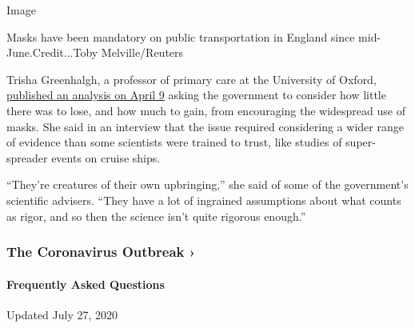 Image

Masks have been mandatory on public transportation in England since
mid-June.Credit...Toby Melville/Reuters

Trisha Greenhalgh, a professor of primary care at the University of
Oxford, \href{https://www.bmj.com/content/369/bmj.m1435}{published an
analysis on April 9} asking the government to consider how little there
was to lose, and how much to gain, from encouraging the widespread use
of masks. She said in an interview that the issue required considering a
wider range of evidence than some scientists were trained to trust, like
studies of super-spreader events on cruise ships.

``They're creatures of their own upbringing,'' she said of some of the
government's scientific advisers. ``They have a lot of ingrained
assumptions about what counts as rigor, and so then the science isn't
quite rigorous enough.''

\href{https://www.nytimes.com/news-event/coronavirus?action=click\&pgtype=Article\&state=default\&region=MAIN_CONTENT_3\&context=storylines_faq}{}

\hypertarget{the-coronavirus-outbreak-}{%
\subsubsection{The Coronavirus Outbreak
›}\label{the-coronavirus-outbreak-}}

\hypertarget{frequently-asked-questions}{%
\paragraph{Frequently Asked
Questions}\label{frequently-asked-questions}}

Updated July 27, 2020

